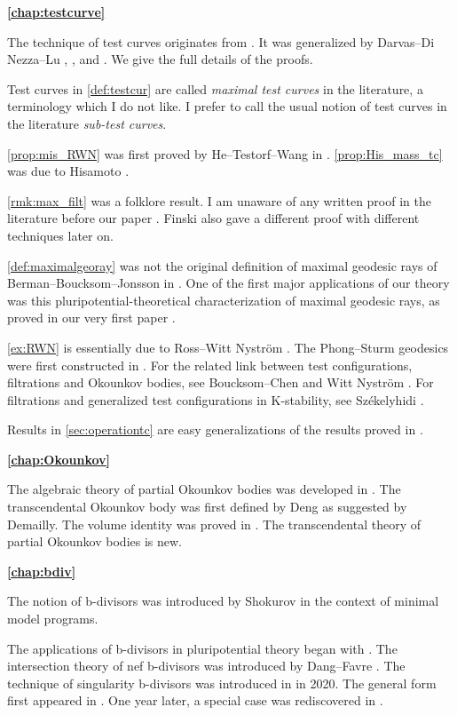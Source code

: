 \textbf{\cref{chap:testcurve}}

The technique of test curves originates from \cite{RWN14}. It was generalized by Darvas--Di Nezza--Lu \cite{DDNL18big}, \cite{DX21}, \cite{DZ22} and \cite{DXZ23}.
We give the full details of the proofs.

Test curves in \cref{def:testcur} are called \emph{maximal test curves} in the literature, a terminology which I do not like. I prefer to call the usual notion of test curves in the literature \emph{sub-test curves}.

\cref{prop:mis_RWN} was first proved by He--Testorf--Wang in \cite{HTW23}. \cref{prop:His_mass_tc} was due to Hisamoto \cite{His16}.

\cref{rmk:max_filt} was a folklore result. I am unaware of any written proof in the literature before our paper \cite{DX22}. Finski \cite{Fin22b} also gave a different proof with different techniques later on.

\cref{def:maximalgeoray} was not the original definition of maximal geodesic rays of Berman--Boucksom--Jonsson in \cite{BBJ21}. One of the first major applications of our theory was this pluripotential-theoretical characterization of maximal geodesic rays, as proved in our very first paper \cite{DX22}.

\cref{ex:RWN} is essentially due to Ross--Witt Nystr\"om \cite{RWN14}. The Phong--Sturm geodesics were first constructed in \cite{PS07}. For the related link between test configurations, filtrations and Okounkov bodies, see Boucksom--Chen \cite{BC11} and Witt Nystr\"om \cite{WN12}. For filtrations and generalized test configurations in K-stability, see Sz\'ekelyhidi \cite{Sze15}.

Results in \cref{sec:operationtc} are easy generalizations of the results proved in \cite{Xia23Operations}.

\textbf{\cref{chap:Okounkov}}

The algebraic theory of partial Okounkov bodies was developed in \cite{Xia21}.
The transcendental Okounkov body was first defined by Deng \cite{Deng17} as suggested by Demailly. The volume identity was proved in \cite{DRWNXZ}. The transcendental theory of partial Okounkov bodies is new.

\textbf{\cref{chap:bdiv}}

The notion of b-divisors was introduced by Shokurov \cite{Sho93} in the context of minimal model programs.

The applications of b-divisors in pluripotential theory began with \cite{BFJ09}. The intersection theory of nef b-divisors was introduced by Dang--Favre \cite{DF20}. The technique of singularity b-divisors was introduced in \cite{XiaPPT} in 2020. The general form first appeared in \cite{Xia22}. One year later, a special case was rediscovered in \cite{BBGHdJ21}.

